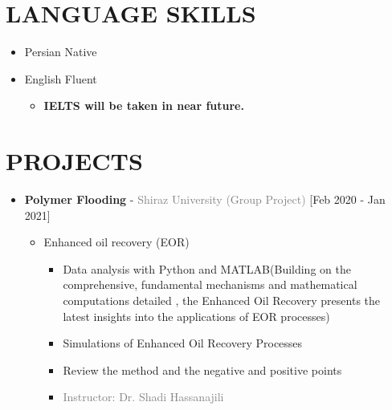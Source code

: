 \documentclass[10pt,a4paper,sans]{moderncv} %
\begin{document}
	
	
	
	
	
	
	\vspace{-1.0em}
	
	\section{LANGUAGE SKILLS}
	
	\begin{itemize}
	\item Persian \hspace{5 pt} Native
	\item English \hspace{6 pt} Fluent   
		\begin{itemize}
			 \item\textbf{IELTS will be taken in near future.}

		\end{itemize}
	\end{itemize} 
	
	
	\vspace{5.5em}
	
	\vspace{  -0.4 em}
	\section{PROJECTS}
	\begin{itemize}
		\item {}  \textbf{Polymer Flooding} - \textcolor{gray}{Shiraz University}    \hfill\textcolor{gray}{(Group Project)}   [Feb 2020 - Jan 2021]
		\begin{itemize}
			\item Enhanced oil recovery (EOR) 
			\begin{itemize} 
		     	\item Data analysis with Python and MATLAB(Building on the comprehensive, fundamental mechanisms and mathematical computations detailed , the Enhanced Oil Recovery presents the latest insights into the applications of EOR processes)
		     	\item Simulations of Enhanced Oil Recovery Processes
				\item Review the method and the negative and positive points
				
			    
				\item\textcolor{gray}{Instructor: Dr. Shadi Hassanajili}
			\end{itemize}
			
				\newline
			
		\end{itemize}
	\end{itemize}
	
\end{document}
